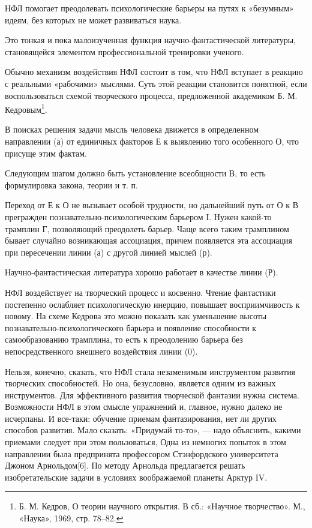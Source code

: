 НФЛ помогает преодолевать  психологические барьеры на  путях к  «безумным»
идеям, без которых не может развиваться наука.

Это тонкая и пока малоизученная функция научно-фантастической  литературы,
становящейся элементом профессиональной тренировки ученого.

Обычно механизм воздействия НФЛ состоит в  том, что НФЛ вступает в реакцию
с  реальными «рабочими»  мыслями. Суть  этой реакции  становится понятной,
если воспользоваться схемой  творческого процесса, предложенной академиком
Б. М. Кедровым\footnote{Б.  М. Кедров, О теории научного  открытия. В сб.:
«Научное творчество». М., «Наука», 1969, стр. 78–82.}.

В  поисках  решения   задачи  мысль  человека   движется  в   определенном
направлении (а) от единичных факторов Е к выявлению того особенного О, что
присуще этим фактам.

Следующим  шагом  должно   быть  установление  всеобщности   В,  то   есть
формулировка закона, теории и т. п.

Переход от Е к  О не вызывает особой трудности, но дальнейший  путь от О к
В  прегражден  познавательно-психологическим  барьером I.  Нужен  какой-то
трамплин  Г, позволяющий  преодолеть барьер.  Чаще всего  таким трамплином
бывает случайно  возникающая ассоциация, причем появляется  эта ассоциация
при пересечении линии (а) с другой линией мыслей (р).

Научно-фантастическая литература хорошо работает в качестве линии (Р).

НФЛ  воздействует  на творческий  процесс  и  косвенно. Чтение  фантастики
постепенно  ослабляет  психологическую инерцию,  повышает  восприимчивость
к   новому.  На   схеме  Кедрова   это  можно   показать  как   уменьшение
высоты  познавательно-психологического  барьера  и  появление  способности
к   самообразованию  трамплина,   то  есть   к  преодолению   барьера  без
непосредственного внешнего воздействия линии (0).

Нельзя, конечно, сказать, что НФЛ стала незаменимым инструментом  развития
творческих способностей.  Но она,  безусловно,  является одним  из  важных
инструментов. Для эффективного развития творческой фантазии нужна система.
Возможности НФЛ  в этом  смысле  упражнений и,  главное, нужно  далеко  не
исчерпаны. И  все-таки: обучение  приемам  фантазирования, нет  ли  других
способов развития.  Мало  сказать:  «Придумай то-то»,  —  надо  объяснить,
какими приемами следует при этом пользоваться, Одна из немногих попыток  в
этом направлении была  предпринята профессором Стэнфордского  университета
Джоном   Арнольдом[6].   По    методу   Арнольда   предлагается    решать
изобретательские задачи в условиях воображаемой планеты Арктур IV.

